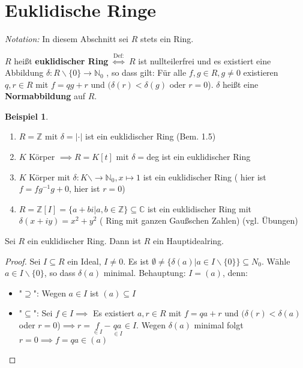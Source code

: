 \documentclass[a4paper, titlepage]{article}
\theoremstyle{definition}
\newtheorem{bsp}[satz]{Beispiel}
\newcommand{\N}{\mathbb{N}}
\newcommand{\Z}{\mathbb{Z}}
\newcommand{\C}{\mathbb{C}}
\begin{document}
	\section{Euklidische Ringe}
\textit{Notation:} In diesem Abschnitt sei $R$ stets ein Ring.
\begin{definition}
    $R$ heißt \textbf{euklidischer Ring} $\overset{\text{Def:}}{\Leftrightarrow} $ $R$ ist nullteilerfrei und es existiert eine Abbildung $\delta:R\backslash \{0\} \longrightarrow \N_{0}$ , so dass gilt: Für alle $f,g\in R,g\neq 0$ existieren $q,r\in R $ mit $f=qg+r$ und $(\delta(r)<\delta(g)$ oder $r=0$). $\delta$ heißt eine \textbf{Normabbildung} auf $R$.

\end{definition}
\begin{bsp} 
    \begin{enumerate}
        \item $R=\Z$ mit $\delta =|\cdot| $ ist ein euklidischer Ring (Bem. 1.5)
        \item $K$ Körper $\implies R=K[t]$ mit $\delta =$deg ist ein euklidischer Ring 
        \item $K $ Körper mit $\delta : K\backslash \longrightarrow \N_0, x\mapsto 1$ ist ein euklidischer Ring ( hier ist $f=fg^{-1}g+0$, hier ist $r=0$)
        \item $R=\Z[I]=\{a+bi|a,b\in \Z\}\subseteq \C$ ist ein euklidischer Ring mit $\delta(x+iy)=x^2+y^2$ ( Ring mit ganzen Gaußschen Zahlen) (vgl. Übungen)
    \end{enumerate}
\end{bsp}
\begin{satz}
    Sei $R$ ein euklidischer Ring. Dann ist $R$ ein Hauptidealring.

\end{satz}
\begin{proof}
Sei $I\subseteq R $ ein Ideal, $I\neq 0$. Es ist $\emptyset \neq \{\delta(a)|a\in I\backslash \{0\}\}\subseteq N_0$. Wähle $a\in I\backslash \{0\}$, so dass $\delta(a) $ minimal. Behauptung: $I=(a)$, denn: \begin{itemize}
    \item "$\supseteq$": Wegen $a\in I $ ist $(a)\subseteq I$
    \item "$\subseteq$": Sei $f\in I\implies $ Es existiert $a,r\in R$ mit $f=qa+r$ und $(\delta(r)<\delta(a)$ oder $r=0$)$\implies r=\underset{\in I}{f}-\underset{\in I}{qa}\in I$. Wegen $\delta(a)$ minimal folgt $r=0\implies f=qa\in (a)$
\end{itemize}
\end{proof}
\end{document}
